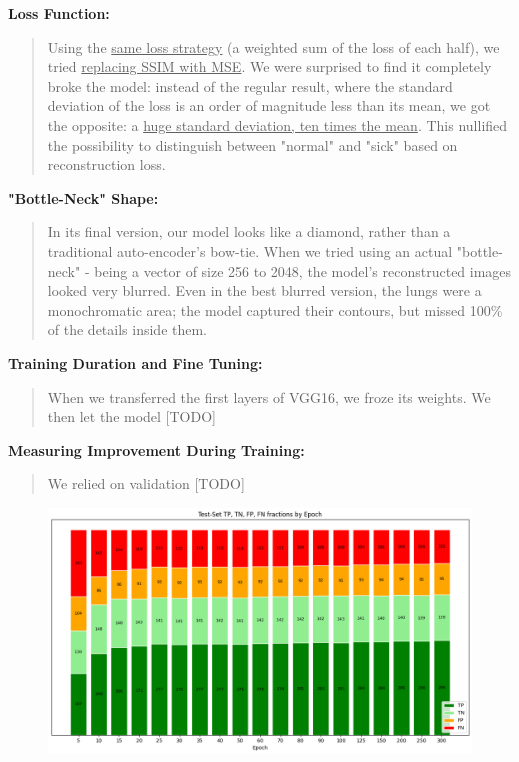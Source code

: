 \documentclass{article}
\begin{document}
\textbf{Loss Function:} 
\begin{quote}
Using the \uline{same loss strategy} (a weighted sum of the loss of each half), we tried \uline{replacing SSIM with MSE}. We were surprised to find it completely broke the model: instead of the regular result, where the standard deviation of the loss is an order of magnitude less than its mean, we got the opposite: a \uline{huge standard deviation, ten times the mean}. This nullified the possibility to distinguish between "normal" and "sick" based on reconstruction loss.
\end{quote}

\textbf{"Bottle-Neck" Shape:} 
\begin{quote}
In its final version, our model looks like a diamond, rather than a traditional auto-encoder's bow-tie. When we tried using an actual "bottle-neck" - being a vector of size 256 to 2048, the model's reconstructed images looked very blurred. Even in the best blurred version, the lungs were a monochromatic area; the model captured their contours, but missed 100\% of the details inside them.
\end{quote}

\textbf{Training Duration and Fine Tuning:}
\begin{quote}
When we transferred the first layers of VGG16, we froze its weights. We then let the model [TODO]
\end{quote}


\textbf{Measuring Improvement During Training:}
\begin{quote}
We relied on validation [TODO]
\end{quote}

\begin{figure}[H]
  \centering
  \includegraphics[width=1\linewidth]{confusion_by_epoch.png}
\end{figure}
\end{document}
